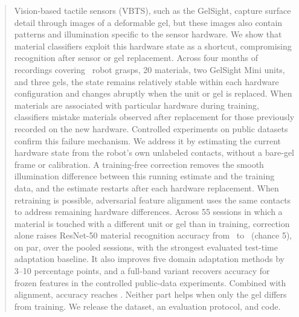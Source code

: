 \begin{abstract}
Vision-based tactile sensors (VBTS), such as the GelSight, capture surface detail through images of a deformable gel, but these images also contain patterns and illumination specific to the sensor hardware. We show that material classifiers exploit this hardware state as a shortcut, compromising recognition after sensor or gel replacement. Across four months of recordings covering \EpRecorded\ robot grasps, 20 materials, two GelSight Mini units, and three gels, the state remains relatively stable within each hardware configuration and changes abruptly when the unit or gel is replaced. When materials are associated with particular hardware during training, classifiers mistake materials observed after replacement for those previously recorded on the new hardware. Controlled experiments on public datasets confirm this failure mechanism. We address it by estimating the current hardware state from the robot's own unlabeled contacts, without a bare-gel frame or calibration. A training-free correction removes the smooth illumination difference between this running estimate and the training data, and the estimate restarts after each hardware replacement. When retraining is possible, adversarial feature alignment uses the same contacts to address remaining hardware differences. Across 55 sessions in which a material is touched with a different unit or gel than in training, correction alone raises ResNet-50 material recognition accuracy from \XpRecipeAcc\ to \XpReadAcc\pct\ (chance 5\pct), on par, over the pooled sessions, with the strongest evaluated test-time adaptation baseline. It also improves five domain adaptation methods by 3--10 percentage points, and a full-band variant recovers accuracy for frozen features in the controlled public-data experiments. Combined with alignment, accuracy reaches \XpFullAcc\pct. Neither part helps when only the gel differs from training. We release the dataset, an evaluation protocol, and code.
\end{abstract}
